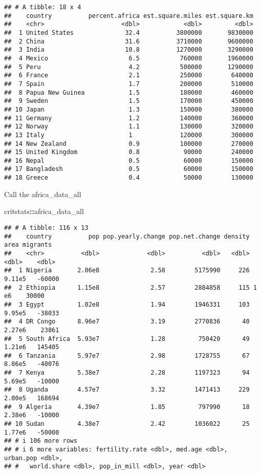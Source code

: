 \documentclass[
]{article}
\newenvironment{Shaded}{\begin{snugshade}}{\end{snugshade}}
\newcommand{\NormalTok}[1]{#1}
\newcommand{\SpecialCharTok}[1]{\textcolor[rgb]{0.81,0.36,0.00}{\textbf{#1}}}
\begin{document}
\begin{verbatim}
## # A tibble: 18 x 4
##    country          percent.africa est.square.miles est.square.km
##    <chr>                     <dbl>            <dbl>         <dbl>
##  1 United States              32.4          3800000       9830000
##  2 China                      31.6          3710000       9600000
##  3 India                      10.8          1270000       3290000
##  4 Mexico                      6.5           760000       1960000
##  5 Peru                        4.2           500000       1290000
##  6 France                      2.1           250000        640000
##  7 Spain                       1.7           200000        510000
##  8 Papua New Guinea            1.5           180000        460000
##  9 Sweden                      1.5           170000        450000
## 10 Japan                       1.3           150000        380000
## 11 Germany                     1.2           140000        360000
## 12 Norway                      1.1           130000        320000
## 13 Italy                       1             120000        300000
## 14 New Zealand                 0.9           100000        270000
## 15 United Kingdom              0.8            90000        240000
## 16 Nepal                       0.5            60000        150000
## 17 Bangladesh                  0.5            60000        150000
## 18 Greece                      0.4            50000        130000
\end{verbatim}

Call the africa\_data\_all

\begin{Shaded}
\begin{Highlighting}[]
\NormalTok{critstats}\SpecialCharTok{::}\NormalTok{africa\_data\_all }
\end{Highlighting}
\end{Shaded}

\begin{verbatim}
## # A tibble: 116 x 13
##    country          pop pop.yearly.change pop.net.change density   area migrants
##    <chr>          <dbl>             <dbl>          <dbl>   <dbl>  <dbl>    <dbl>
##  1 Nigeria       2.06e8              2.58        5175990     226 9.11e5   -60000
##  2 Ethiopia      1.15e8              2.57        2884858     115 1   e6    30000
##  3 Egypt         1.02e8              1.94        1946331     103 9.95e5   -38033
##  4 DR Congo      8.96e7              3.19        2770836      40 2.27e6    23861
##  5 South Africa  5.93e7              1.28         750420      49 1.21e6   145405
##  6 Tanzania      5.97e7              2.98        1728755      67 8.86e5   -40076
##  7 Kenya         5.38e7              2.28        1197323      94 5.69e5   -10000
##  8 Uganda        4.57e7              3.32        1471413     229 2.00e5   168694
##  9 Algeria       4.39e7              1.85         797990      18 2.38e6   -10000
## 10 Sudan         4.38e7              2.42        1036022      25 1.77e6   -50000
## # i 106 more rows
## # i 6 more variables: fertility.rate <dbl>, med.age <dbl>, urban.pop <dbl>,
## #   world.share <dbl>, pop_in_mill <dbl>, year <dbl>
\end{verbatim}
\end{document}
